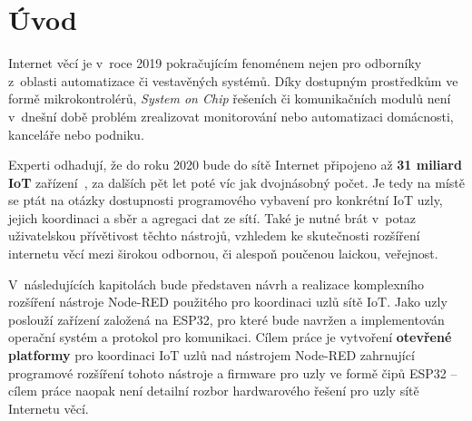 \chapter{Úvod}
\label{ch:uvod}

Internet věcí je v~roce 2019 pokračujícím fenoménem nejen pro odborníky z~oblasti automatizace či vestavěných systémů.
Díky dostupným prostředkům ve formě mikrokontrolérů, \textit{System on Chip} řešeních či komunikačních modulů není
v~dnešní době problém zrealizovat monitorování nebo automatizaci domácnosti, kanceláře nebo podniku.

Experti odhadují, že do roku 2020 bude do sítě Internet připojeno až \textbf{31 miliard IoT}
zařízení~\cite{StatistaIoT, IoTTrends}, za dalších pět let poté víc jak dvojnásobný počet.
Je tedy na místě se ptát na otázky dostupnosti programového vybavení pro konkrétní IoT uzly, jejich koordinaci a sběr
a agregaci dat ze sítí.
Také je nutné brát v~potaz uživatelskou přívětivost těchto nástrojů, vzhledem ke
skutečnosti rozšíření internetu věcí mezi širokou odbornou, či alespoň poučenou laickou, veřejnost.

V~následujících kapitolách bude představen návrh a realizace komplexního rozšíření nástroje Node-RED použitého pro
koordinaci uzlů sítě IoT. Jako uzly poslouží zařízení založená na ESP32, pro které bude navržen a implementován
operační systém a protokol pro komunikaci.
Cílem práce je vytvoření \textbf{otevřené platformy} pro koordinaci IoT uzlů nad nástrojem Node-RED zahrnující
programové rozšíření tohoto nástroje a firmware pro uzly ve formě čipů ESP32 -- cílem práce naopak není
detailní rozbor hardwarového řešení pro uzly sítě Internetu věcí.

